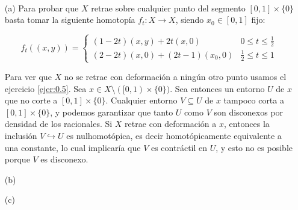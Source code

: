 \documentclass[twoside]{article}
\begin{document}
\begin{solucion}\
\begin{enumerate}
\item[(a)] Para probar que $X$ retrae sobre cualquier punto del segmento $[0,1]\times\{0\}$ basta tomar la siguiente homotopía $f_t:X\to X$, siendo $x_0\in [0,1]$ fijo:

\[
f_t((x,y))=\begin{cases}
(1-2t)(x,y)+2t(x,0) & 0\leq t\leq \frac{1}{2}\\
(2-2t)(x,0)+(2t-1)(x_0,0) & \frac{1}{2}\leq t\leq 1
\end{cases}
\]

Para ver que $X$ no se retrae con deformación a ningún otro punto usamos el ejercicio \ref{ejer:0.5}. Sea $x\in X\setminus([0,1)\times\{0\})$. Sea entonces un entorno $U$ de $x$ que no corte a $[0,1]\times\{0\}$. Cualquier entorno $V\subseteq U$ de $x$ tampoco corta a $[0,1]\times\{0\}$, y podemos garantizar que tanto $U$ como $V$ son disconexos por densidad de los racionales. Si $X$ retrae con deformación a $x$, entonces la inclusión $V\hookrightarrow U$ es nulhomotópica, es decir homotópicamente equivalente a una constante, lo cual implicaría que $V$ es contráctil en $U$, y esto no es posible porque $V$ es disconexo. 

\item[(b)]

\item[(c)]
\end{enumerate}

\end{solucion}

\newpage





%
%
%
%
%
%
%
%
%
%
%
%
%
%
%
%
%
%
%
%
%
%
%
%
%
%
%
%
%
%
\end{document}
